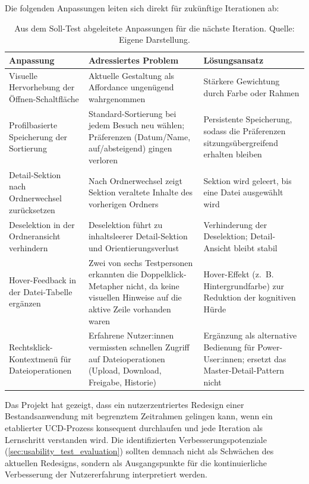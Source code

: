 Die folgenden Anpassungen leiten sich direkt für zukünftige Iterationen ab:

\begin{table}[H]
    \centering
    \scriptsize
    \begin{tabular}{@{}p{6.0cm}p{5.0cm}p{5.0cm}@{}}
        \toprule
        \textbf{Anpassung} & \textbf{Adressiertes Problem} & \textbf{Lösungsansatz} \\
        \midrule
        Visuelle Hervorhebung der Öffnen-Schaltfläche & Aktuelle Gestaltung als Affordance ungenügend wahrgenommen & Stärkere Gewichtung durch Farbe oder Rahmen \\
        \addlinespace
        Profilbasierte Speicherung der Sortierung & Standard-Sortierung bei jedem Besuch neu wählen; Präferenzen (Datum/Name, auf/absteigend) gingen verloren & Persistente Speicherung, sodass die Präferenzen sitzungsübergreifend erhalten bleiben \\
        \addlinespace
        Detail-Sektion nach Ordnerwechsel zurücksetzen & Nach Ordnerwechsel zeigt Sektion veraltete Inhalte des vorherigen Ordners & Sektion wird geleert, bis eine Datei ausgewählt wird \\
        \addlinespace
        Deselektion in der Ordneransicht verhindern & Deselektion führt zu inhaltsleerer Detail-Sektion und Orientierungsverlust & Verhinderung der Deselektion; Detail-Ansicht bleibt stabil \\
        \addlinespace
        Hover-Feedback in der Datei-Tabelle ergänzen & Zwei von sechs Testpersonen erkannten die Doppelklick-Metapher nicht, da keine visuellen Hinweise auf die aktive Zeile vorhanden waren & Hover-Effekt (z.~B. Hintergrundfarbe) zur Reduktion der kognitiven Hürde \\
        \addlinespace
        Rechtsklick-Kontextmenü für Dateioperationen & Erfahrene Nutzer:innen vermissten schnellen Zugriff auf Dateioperationen (Upload, Download, Freigabe, Historie) & Ergänzung als alternative Bedienung für Power-User:innen; ersetzt das Master-Detail-Pattern nicht \\
        \bottomrule
    \end{tabular}
    \caption[Anpassungen für die nächste Iteration]{Aus dem Soll-Test abgeleitete Anpassungen für die nächste Iteration. Quelle: Eigene Darstellung.}
    \label{tab:anpassungen}
\end{table}

Das Projekt hat gezeigt, dass ein nutzerzentriertes Redesign einer Bestandsanwendung mit begrenztem Zeitrahmen gelingen kann, wenn ein etablierter UCD-Prozess konsequent durchlaufen und jede Iteration als Lernschritt verstanden wird. Die identifizierten Verbesserungspotenziale (\autoref{sec:usability_test_evaluation}) sollten demnach nicht als Schwächen des aktuellen Redesigns, sondern als Ausgangspunkte für die kontinuierliche Verbesserung der Nutzererfahrung interpretiert werden.
